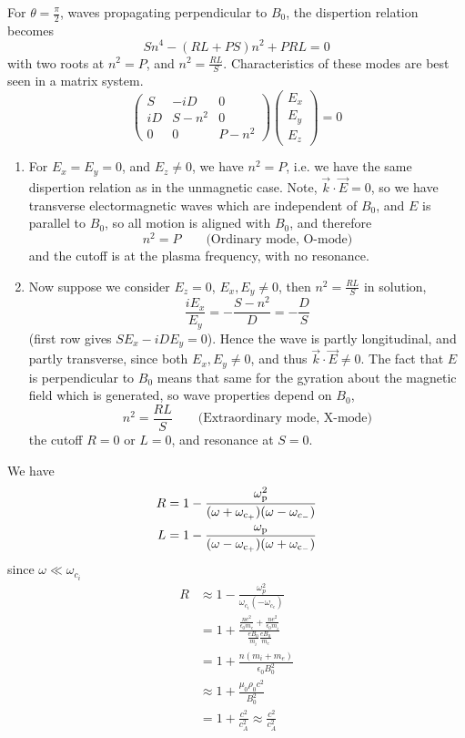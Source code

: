 \documentclass{book}         		                %
\begin{document}
For $\theta = \frac{\pi}{2}$, waves propagating perpendicular to $B_0$, the dispertion relation becomes 
\[ Sn^4 - (RL + PS)n^2 +PRL = 0 \]
with two roots at $n^2=P$, and $n^2 = \frac{RL}{S}$.
Characteristics of these modes are best seen in a matrix system.
\begin{equation}
\label{eq:dispertion}
  \begin{pmatrix}
    S  & -iD   & 0 \\
    iD & S-n^2 & 0 \\
0      & 0     & P-n^2
  \end{pmatrix}
  \begin{pmatrix}
    E_x \\ E_y \\ E_z
  \end{pmatrix} = 0
\end{equation}
\begin{enumerate}
\item For $E_x = E_y = 0$, and $E_z \neq 0$, we have $n^2=P$, i.e.  we have the same dispertion relation as in the unmagnetic case. Note, $\vec{k}\cdot \vec{E} = 0$, so we have transverse electormagnetic waves which are independent of $B_0$, and $E$ is parallel to $B_0$, so all motion is aligned with $B_0$, and therefore
\[ n^2 = P \qquad \text{(Ordinary mode, O-mode)}\]
and the cutoff is at the plasma frequency, with no resonance.
\item Now suppose we consider $E_z=0$, $E_x, E_y \neq 0$, then $n^2 = \frac{RL}{S}$ in solution,
  \begin{equation*}
    \frac{iE_x}{E_y} = - \frac{S-n^2}{D} = - \frac{D}{S}
  \end{equation*}
(first row gives $SE_x - iD E_y = 0$). Hence the wave is partly longitudinal, and partly transverse, since both $E_x, E_y \neq 0$, and thus $\vec{k} \cdot \vec{E} \neq 0$. The fact that $E$ is perpendicular to $B_0$ means that same for the gyration about the magnetic field which is generated, so wave properties depend on $B_0$,
\[ n^2 = \frac{RL}{S} \qquad \text{(Extraordinary mode, X-mode)}\]
the cutoff $R=0$ or $L=0$, and resonance at $S=0$. 
\end{enumerate}
We have
\begin{align*}
  R & = 1 - \frac{\omega_{\rm p}^2}{(\omega+\omega_{\rm c_+})(\omega-\omega_{c_-})} \\
  L & = 1 - \frac{\omega_{\rm p}}{(\omega-\omega_{\rm c_+})(\omega+\omega_{\rm c_-})}
\end{align*}
since $\omega \ll \omega_{c_i}$
\begin{align*}
  R &\approx 1 - \frac{\omega_p^2}{\omega_{c_i}(-\omega_{c_e})} \\
    &= 1 + \frac{\frac{ne^2}{\epsilon_0 m_e} + \frac{n e^2}{\epsilon_0 m_i} } {\frac{eB_0}{m_i} \frac{e B_0}{m_e}} \\
    &= 1 + \frac{n(m_i+m_e)}{\epsilon_0 B_0^2} \\
    &\approx 1 + \frac{\mu_0 \rho_0 c^2}{B_0^2} \\
    &= 1 + \frac{c^2}{c_A^2} \approx \frac{c^2}{c_A^2}
\end{align*}
\end{document}

